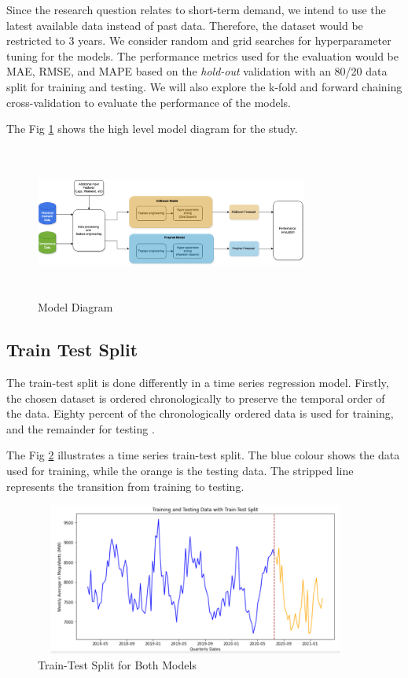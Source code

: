 \documentclass[mstat,12pt]{unswthesis}
\begin{document}
Since the research question relates to short-term demand, we intend to
use the latest available data instead of past data. Therefore, the
dataset would be restricted to 3 years. We consider random and grid
searches for hyperparameter tuning for the models. The performance
metrics used for the evaluation would be MAE, RMSE, and MAPE based on
the \emph{hold-out} validation with an 80/20 data split for training and
testing. We will also explore the k-fold and forward chaining
cross-validation to evaluate the performance of the models.

The Fig \ref{model_diagram} shows the high level model diagram for the
study.

\begin{figure}[H]
\centering
\includegraphics[width=0.80\textwidth,height=5cm]{model_diagram.png}
\caption{Model Diagram}
\label{model_diagram}
\end{figure}

\subsection{Train Test Split}\label{train-test-split}

The train-test split is done differently in a time series regression
model. Firstly, the chosen dataset is ordered chronologically to
preserve the temporal order of the data. Eighty percent of the
chronologically ordered data is used for training, and the remainder for
testing \cite{brownlee_2020_how}.

The Fig \ref{traintest} illustrates a time series train-test split. The
blue colour shows the data used for training, while the orange is the
testing data. The stripped line represents the transition from training
to testing.

\begin{figure}[H]
\centering
\includegraphics[width=0.95\textwidth, height=5cm]{traintest.png}
\caption{Train-Test Split for Both Models}\label{traintest}
\end{figure}
\end{document}
